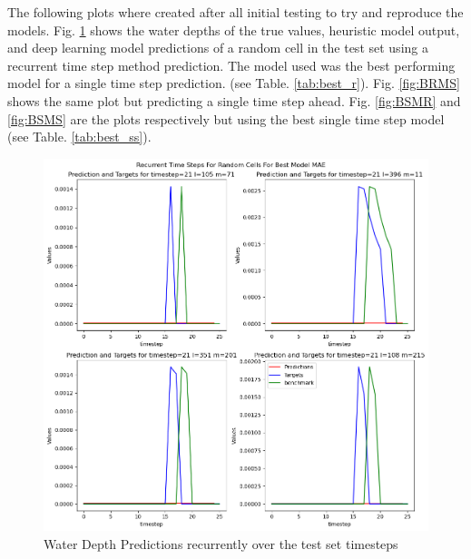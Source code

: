 The following plots where created after all initial testing to try and reproduce the models. Fig. \ref{fig:BRMR} shows the water depths of the true values, heuristic model output, and deep learning model predictions of a random cell in the test set using a recurrent time step method prediction. The model used was the best performing model for a single time step prediction.  (see Table. \ref{tab:best_r}). Fig. \ref{fig:BRMS} shows the same plot but predicting a single time step ahead. Fig. \ref{fig:BSMR} and \ref{fig:BSMS} are the plots respectively but using the best single time step model (see Table. \ref{tab:best_ss}).

\begin{figure}[tbph]
	\centering
	\includegraphics[width=0.8\linewidth, height=0.3\textheight]{Figures/Results/Final_Results/Best_Model_recurrentMAE_recurrent_random_cell}
	\caption[Best Recurrent MAE random cell over time]{Water Depth Predictions recurrently over the test set timesteps}
	\label{fig:BRMR}
\end{figure}



